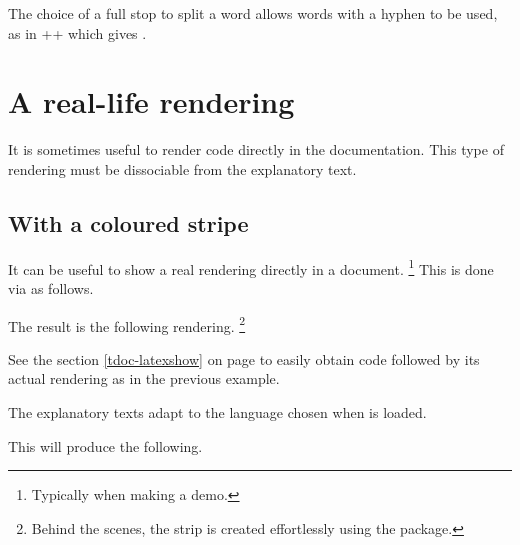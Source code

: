 \begin{tdocrem}
    The choice of a full stop to split a word allows words with a hyphen to be used, as in \tdocinlatex++ which gives .
\end{tdocrem}


\section{A real-life rendering} \label{tdoc-showcase}

It is sometimes useful to render code directly in the documentation. This type of rendering must be dissociable from the explanatory text.



\subsection{With a coloured stripe} \label{tdoc-color-macros}

\begin{tdocexa} 
    It can be useful to show a real rendering directly in a document.
    \footnote{
        Typically when making a demo.
    }
    This is done via  as follows.



    The result is the following rendering.
    \footnote{
        Behind the scenes, the strip is created effortlessly using the  package.
    }
\end{tdocexa}





\smallskip

\begin{tdocrem}
    See the section \ref{tdoc-latexshow} on page \pageref{tdoc-latexshow} to easily obtain code followed by its actual rendering as in the previous example.
\end{tdocrem}


\begin{tdocnote}
    The explanatory texts adapt to the language chosen when \thispack{} is loaded.
\end{tdocnote}




\begin{tdocexa}
    \leavevmode



    This will produce the following.

    \medskip

    

\end{tdocexa}


